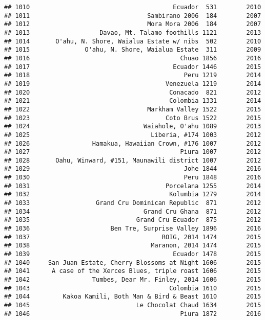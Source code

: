 \documentclass[
]{article}
\begin{document}
\begin{verbatim}
## 1010                                       Ecuador  531        2010
## 1011                                Sambirano 2006  184        2007
## 1012                                Mora Mora 2006  184        2007
## 1013                   Davao, Mt. Talamo foothills 1121        2013
## 1014       O'ahu, N. Shore, Waialua Estate w/ nibs  502        2010
## 1015               O'ahu, N. Shore, Waialua Estate  311        2009
## 1016                                         Chuao 1856        2016
## 1017                                       Ecuador 1446        2015
## 1018                                          Peru 1219        2014
## 1019                                     Venezuela 1219        2014
## 1020                                      Conacado  821        2012
## 1021                                      Colombia 1331        2014
## 1022                                Markham Valley 1522        2015
## 1023                                     Coto Brus 1522        2015
## 1024                               Waiahole, O'ahu 1089        2013
## 1025                                 Liberia, #174 1003        2012
## 1026                 Hamakua, Hawaiian Crown, #176 1007        2012
## 1027                                         Piura 1007        2012
## 1028       Oahu, Winward, #151, Maunawili district 1007        2012
## 1029                                          Johe 1844        2016
## 1030                                          Peru 1848        2016
## 1031                                     Porcelana 1255        2014
## 1032                                      Kolumbia 1279        2014
## 1033                  Grand Cru Dominican Republic  871        2012
## 1034                               Grand Cru Ghana  871        2012
## 1035                             Grand Cru Ecuador  875        2012
## 1036                      Ben Tre, Surprise Valley 1896        2016
## 1037                                    ROIG, 2014 1474        2015
## 1038                                 Maranon, 2014 1474        2015
## 1039                                       Ecuador 1478        2015
## 1040     San Juan Estate, Cherry Blossoms at Night 1606        2015
## 1041      A case of the Xerces Blues, triple roast 1606        2015
## 1042                 Tumbes, Dear Mr. Finley, 2014 1606        2015
## 1043                                      Colombia 1610        2015
## 1044         Kakoa Kamili, Both Man & Bird & Beast 1610        2015
## 1045                             Le Chocolat Chaud 1634        2015
## 1046                                         Piura 1872        2016

\end{verbatim}
\end{document}

